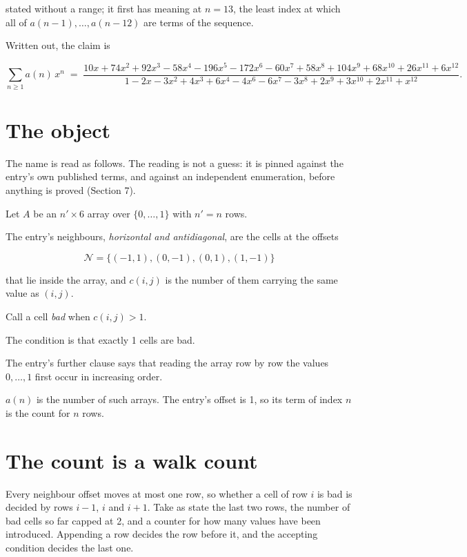 \documentclass[11pt]{article}
\theoremstyle{definition}
\begin{document}
stated without a range; it first has meaning at $n = 13$, the least index at which all of $a(n-1),\dots,a(n-12)$ are terms of the sequence.

Written out, the claim is

\[\sum_{n \ge 1} a(n)\,x^n \;=\; \frac{10x + 74x^{2} + 92x^{3} - 58x^{4} - 196x^{5} - 172x^{6} - 60x^{7} + 58x^{8} + 104x^{9} + 68x^{10} + 26x^{11} + 6x^{12}}{1 - 2x - 3x^{2} + 4x^{3} + 6x^{4} - 4x^{6} - 6x^{7} - 3x^{8} + 2x^{9} + 3x^{10} + 2x^{11} + x^{12}}.\]

\section{The object}

The name is read as follows. The reading is not a guess: it is pinned against the entry's own published terms, and against an independent enumeration, before anything is proved (Section 7).

Let $A$ be an $n' \times 6$ array over $\{0,\dots,1\}$ with $n' = n$ rows.

The entry's neighbours, {\itshape horizontal and antidiagonal}, are the cells at the offsets

\[\mathcal{N} = \{(-1,1), (0,-1), (0,1), (1,-1)\}\]

that lie inside the array, and $c(i,j)$ is the number of them carrying the same value as $(i,j)$.

Call a cell {\itshape bad} when $c(i,j) > 1$.

The condition is that exactly 1 cells are bad.

The entry's further clause says that reading the array row by row the values $0,\dots,1$ first occur in increasing order.

$a(n)$ is the number of such arrays. The entry's offset is 1, so its term of index $n$ is the count for $n$ rows.

\section{The count is a walk count}

Every neighbour offset moves at most one row, so whether a cell of row $i$ is bad is decided by rows $i-1$, $i$ and $i+1$. Take as state the last two rows, the number of bad cells so far capped at 2, and a counter for how many values have been introduced. Appending a row decides the row before it, and the accepting condition decides the last one.
\end{document}
